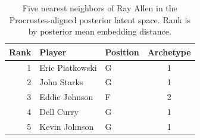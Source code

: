 \begin{table}[htbp]
  \centering\small
  \begin{tabular}{rllc}
    \toprule
    Rank & Player & Position & Archetype \\
    \midrule
    1 & Eric Piatkowski & G & 1 \\
    2 & John Starks & G & 1 \\
    3 & Eddie Johnson & F & 2 \\
    4 & Dell Curry & G & 1 \\
    5 & Kevin Johnson & G & 1 \\
    \bottomrule
  \end{tabular}
  \caption{Five nearest neighbors of Ray Allen in the Procrustes-aligned posterior latent space. Rank is by posterior mean embedding distance.}
  \label{tab:Ray_Allen_neighbors}
\end{table}

